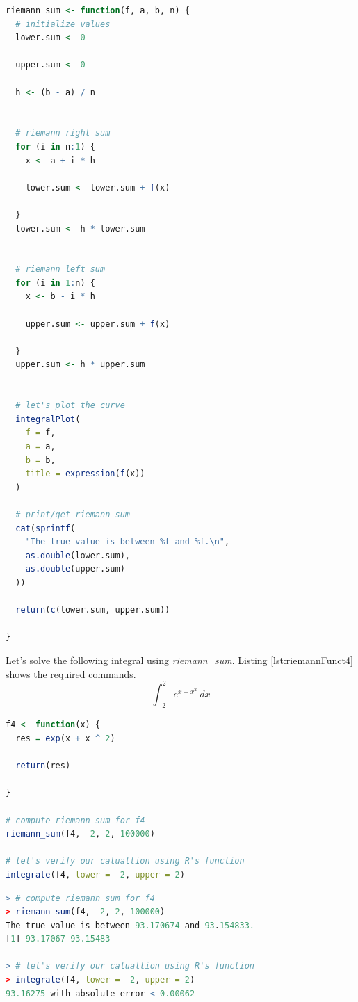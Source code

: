 \documentclass[11pt,a4paper]{article}
\begin{document}
\begin{lstlisting}[frame=trBL, language=R, caption="The \emph{Riemann} function"
\label{lst:riemann_sumFunc}]
riemann_sum <- function(f, a, b, n) {  
  # initialize values
  lower.sum <- 0
  
  upper.sum <- 0
  
  h <- (b - a) / n
  
  
  # riemann right sum
  for (i in n:1) {
    x <- a + i * h
    
    lower.sum <- lower.sum + f(x)
    
  }
  lower.sum <- h * lower.sum
  
  
  # riemann left sum
  for (i in 1:n) {
    x <- b - i * h
    
    upper.sum <- upper.sum + f(x)
    
  }
  upper.sum <- h * upper.sum
  
  
  # let's plot the curve
  integralPlot(
    f = f,
    a = a,
    b = b,
    title = expression(f(x))
  )
  
  # print/get riemann sum
  cat(sprintf(
    "The true value is between %f and %f.\n",
    as.double(lower.sum),
    as.double(upper.sum)
  ))
  
  return(c(lower.sum, upper.sum))
  
}
\end{lstlisting}

Let's solve the following integral using \emph{riemann\_sum}. Listing \ref{lst:riemannFunct4} shows the required commands.
$$ \int_{-2}^{2} e^{x+x^2} \ dx $$

\begin{lstlisting}[frame=trBL, language=R, caption="Define the function and implement \emph{riemann\_sum}"
\label{lst:riemannFunct4}]
f4 <- function(x) {
  res = exp(x + x ^ 2)
  
  return(res)
  
}

# compute riemann_sum for f4
riemann_sum(f4, -2, 2, 100000)

# let's verify our calualtion using R's function
integrate(f4, lower = -2, upper = 2)
\end{lstlisting}

\begin{lstlisting}[frame=trBL, language=R, caption="Listing \ref{lst:riemannFunct4} output"
\label{lst:riemannFunct4_out}]
> # compute riemann_sum for f4
> riemann_sum(f4, -2, 2, 100000)
The true value is between 93.170674 and 93.154833.
[1] 93.17067 93.15483

> # let's verify our calualtion using R's function
> integrate(f4, lower = -2, upper = 2)
93.16275 with absolute error < 0.00062
\end{lstlisting}
\end{document}
